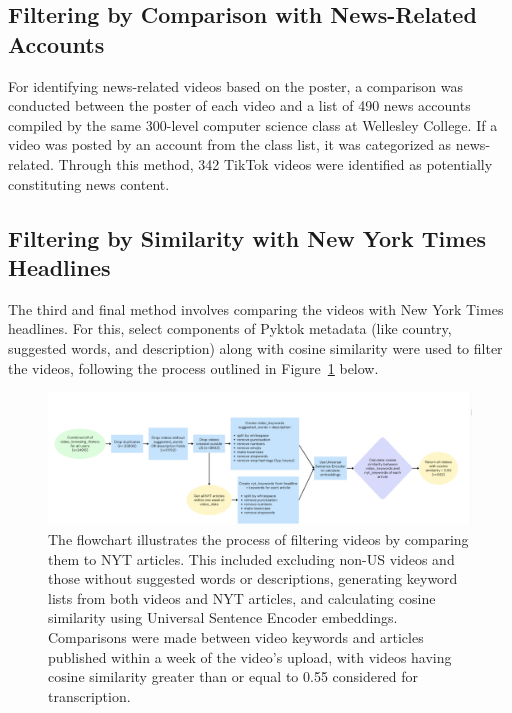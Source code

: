 \documentclass{article}
\begin{document}
\subsection{Filtering by Comparison with News-Related Accounts}
For identifying news-related videos based on the poster, a comparison was conducted between the poster of each video and a list of 490 news accounts compiled by the same 300-level computer science class at Wellesley College. If a video was posted by an account from the class list, it was categorized as news-related. Through this method, 342 TikTok videos were identified as  potentially constituting news content. \newline



\subsection{Filtering by Similarity with New York Times Headlines}
\label{subsec:headline}
The third and final method involves comparing the videos with New York Times headlines. For this, select components of Pyktok metadata (like country, suggested words, and description) along with cosine similarity were used to filter the videos, following the process outlined in Figure~\ref{fig:flowchart} below. \newline

\begin{figure}[h!]
    \centering
    \includegraphics[width=1\linewidth]{flowchart.png} 
    \caption{The flowchart illustrates the process of filtering videos by comparing them to NYT articles. This included excluding non-US videos and those without suggested words or descriptions, generating keyword lists from both videos and NYT articles, and calculating cosine similarity using Universal Sentence Encoder embeddings. Comparisons were made between video keywords and articles published within a week of the video's upload, with videos having cosine similarity greater than or equal to 0.55 considered for transcription.}
    \label{fig:flowchart} 
  \end{figure}
\end{document}
